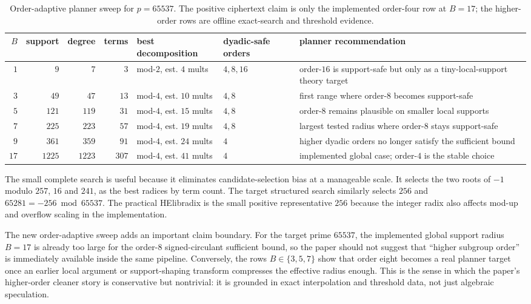 \documentclass[a4paper,runningheads]{llncs}
\newcommand{\HElib}{\textsf{HElib}}
\begin{document}
\begin{table}[t]
\centering
\caption{Order-adaptive planner sweep for $p=65537$.  The positive ciphertext
claim is only the implemented order-four row at $B=17$; the higher-order rows
are offline exact-search and threshold evidence.}
\label{tab:order_adaptive_sweep}
\scriptsize
\begin{tabular}{rrrrllp{4.7cm}}
\toprule
$B$ & support & degree & terms & best decomposition & dyadic-safe orders & planner recommendation \\
\midrule
$1$  & $9$    & $7$    & $3$   & mod-$2$, est. $4$ mults  & $4,8,16$ & order-$16$ is support-safe but only as a tiny-local-support theory target \\
$3$  & $49$   & $47$   & $13$  & mod-$4$, est. $10$ mults & $4,8$    & first range where order-$8$ becomes support-safe \\
$5$  & $121$  & $119$  & $31$  & mod-$4$, est. $15$ mults & $4,8$    & order-$8$ remains plausible on smaller local supports \\
$7$  & $225$  & $223$  & $57$  & mod-$4$, est. $19$ mults & $4,8$    & largest tested radius where order-$8$ stays support-safe \\
$9$  & $361$  & $359$  & $91$  & mod-$4$, est. $24$ mults & $4$      & higher dyadic orders no longer satisfy the sufficient bound \\
$17$ & $1225$ & $1223$ & $307$ & mod-$4$, est. $41$ mults & $4$      & implemented global case; order-$4$ is the stable choice \\
\bottomrule
\end{tabular}
\end{table}

The small complete search is useful because it eliminates candidate-selection
bias at a manageable scale.  It selects the two roots of $-1$ modulo $257$,
$16$ and $241$, as the best radices by term count.  The target structured
search similarly selects $256$ and $65281=-256\bmod65537$.  The practical
\HElib radix is the small positive representative $256$ because the integer
radix also affects mod-up and overflow scaling in the implementation.

The new order-adaptive sweep adds an important claim boundary.  For the target
prime $65537$, the implemented global support radius $B=17$ is already too large
for the order-$8$ signed-circulant sufficient bound, so the paper should not
suggest that “higher subgroup order” is immediately available inside the same
pipeline.  Conversely, the rows $B\in\{3,5,7\}$ show that order eight becomes a
real planner target once an earlier local argument or support-shaping transform
compresses the effective radius enough.  This is the sense in which the paper's
higher-order cleaner story is conservative but nontrivial: it is grounded in
exact interpolation and threshold data, not just algebraic speculation.
\end{document}
